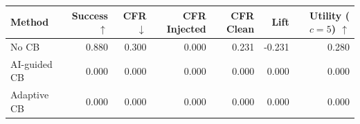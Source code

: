 \begin{tabular}{lrrrrrr}
\toprule
Method & Success $\uparrow$ & CFR $\downarrow$ & CFR Injected & CFR Clean & Lift & Utility ($c=5$) $\uparrow$ \\
\midrule
No CB & 0.880 & 0.300 & 0.000 & 0.231 & -0.231 & 0.280 \\
AI-guided CB & 0.000 & 0.000 & 0.000 & 0.000 & 0.000 & 0.000 \\
Adaptive CB & 0.000 & 0.000 & 0.000 & 0.000 & 0.000 & 0.000 \\
\bottomrule
\end{tabular}
